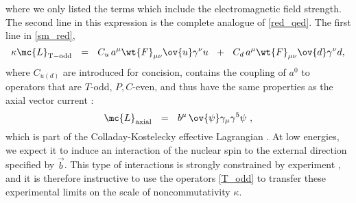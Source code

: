 \documentclass[prl,tightenlines]{revtex4}
\begin{document}
where we only listed the terms which include the electromagnetic field strength.
The second line in this expression is the complete analogue of \eqref{red_qed}.
The first line in \eqref{sm_red}, 
\begin{equation}
\label{T_odd}
	\kappa \mc{L}_{\rm T-odd} ~~=~~ C_u\, a^\mu \wt{F}_{\mu\nu} \ov{u} \gamma^\nu u ~~+~~
				 C_d\, a^\mu \wt{F}_{\mu\nu} \ov{d} \gamma^\nu d,
\end{equation}
where $C_{u(d)}$ are introduced for concision, contains the coupling of $a^0$ to operators that are $ T $-odd, $P,C$-even,  
and thus have the same properties as the axial vector
current \cite{Bolokhov:2006yx}:
%
\begin{equation}
\label{effectiveK}
	\mc{L}_{\rm axial} ~~=~~ b^\mu\, \ov{\psi} \gamma_\mu \gamma^5 \psi~,
\end{equation}
which is part of the Colladay-Kostelecky effective Lagrangian 
\cite{Colladay:1996iz}.
At low energies, we expect it to induce an interaction of the nuclear spin to the external 
direction specified by $ \vec{b} $.
This type of interactions is strongly constrained by experiment \cite{Bear:2000cd}, and it is therefore
instructive to use the operators \eqref{T_odd}
to transfer these experimental limits on the scale of noncommutativity $ \kappa $.
\end{document}
